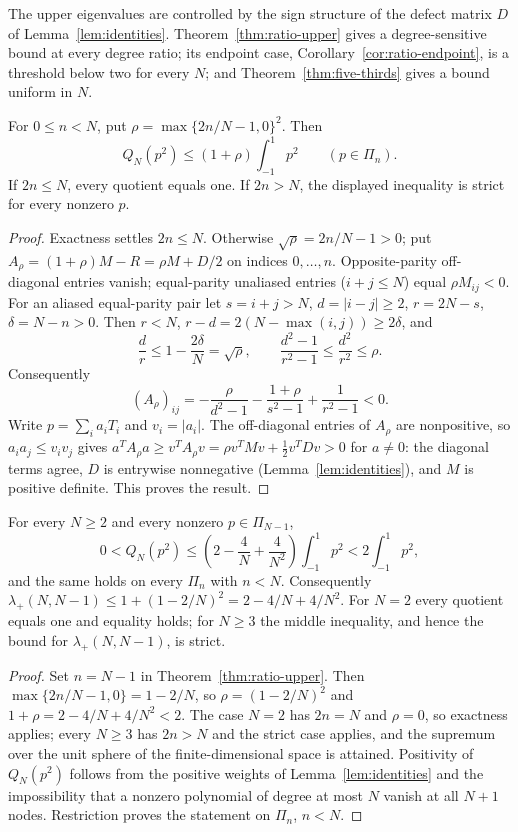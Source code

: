 \documentclass{siamart251216}
\newcommand{\Pn}{\Pi}
\begin{document}
The upper eigenvalues are controlled by the sign structure of the defect
matrix $D$ of Lemma~\ref{lem:identities}. Theorem~\ref{thm:ratio-upper} gives
a degree-sensitive bound at every degree ratio; its endpoint case,
Corollary~\ref{cor:ratio-endpoint}, is a threshold below two for every $N$;
and Theorem~\ref{thm:five-thirds} gives a bound uniform in $N$.

\begin{theorem}\label{thm:ratio-upper}%
For $0\le n<N$, put $\rho=\max\{2n/N-1,0\}^2$. Then
\[
 Q_N(p^2)\le(1+\rho)\int_{-1}^1p^2\qquad(p\in\Pn_n).
\]
If $2n\le N$, every quotient equals one. If $2n>N$, the displayed
inequality is strict for every nonzero $p$.
\end{theorem}
\begin{proof}
Exactness settles $2n\le N$. Otherwise $\sqrt\rho=2n/N-1>0$; put
$A_\rho=(1+\rho)M-R=\rho M+D/2$ on indices $0,\ldots,n$.
Opposite-parity off-diagonal entries vanish; equal-parity unaliased entries
($i+j\le N$) equal $\rho M_{ij}<0$. For an aliased equal-parity pair let
$s=i+j>N$, $d=|i-j|\ge2$, $r=2N-s$, $\delta=N-n>0$.
Then $r<N$, $r-d=2(N-\max(i,j))\ge2\delta$, and
\[
 \frac dr\le1-\frac{2\delta}{N}=\sqrt\rho,\qquad
 \frac{d^2-1}{r^2-1}\le\frac{d^2}{r^2}\le\rho.
\]
Consequently
\[
 (A_\rho)_{ij}=-\frac\rho{d^2-1}
                -\frac{1+\rho}{s^2-1}+\frac1{r^2-1}<0.
\]
Write $p=\sum_ia_iT_i$ and $v_i=|a_i|$. The off-diagonal entries of
$A_\rho$ are nonpositive, so $a_ia_j\le v_iv_j$ gives
$a^TA_\rho a\ge v^TA_\rho v=\rho v^TMv+\tfrac12v^TDv>0$ for $a\ne0$: the
diagonal terms agree, $D$ is entrywise nonnegative
(Lemma~\ref{lem:identities}), and $M$ is positive definite. This proves
the result.
\end{proof}

\begin{corollary}\label{cor:ratio-endpoint}\label{thm:upper}%
For every $N\ge2$ and every nonzero $p\in\Pn_{N-1}$,
\[
 0<Q_N(p^2)\le\left(2-\frac4N+\frac4{N^2}\right)\int_{-1}^1p^2
 <2\int_{-1}^1p^2,
\]
and the same holds on every $\Pn_n$ with $n<N$. Consequently
$\lambda_+(N,N-1)\le1+(1-2/N)^2=2-4/N+4/N^2$. For $N=2$ every quotient
equals one and equality holds; for $N\ge3$ the middle inequality, and hence
the bound for $\lambda_+(N,N-1)$, is strict.
\end{corollary}
\begin{proof}
Set $n=N-1$ in Theorem~\ref{thm:ratio-upper}. Then
$\max\{2n/N-1,0\}=1-2/N$, so $\rho=(1-2/N)^2$ and
$1+\rho=2-4/N+4/N^2<2$. The case $N=2$ has $2n=N$ and $\rho=0$, so exactness
applies; every $N\ge3$ has $2n>N$ and the strict case applies, and the
supremum over the unit sphere of the finite-dimensional space is attained.
Positivity of $Q_N(p^2)$ follows from the positive weights of
Lemma~\ref{lem:identities} and the impossibility that a nonzero polynomial
of degree at most $N$ vanish at all $N+1$ nodes. Restriction proves the
statement on $\Pn_n$, $n<N$.
\end{proof}
\end{document}

